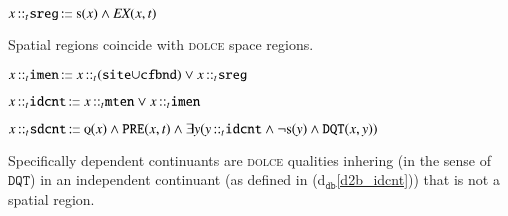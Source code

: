 \documentclass[ao]{iosart2x}
\newcommand{\dolceThrLabel}{\textrm{t$_\texttt{d}$}}
\newcommand{\dbDefLabel}{\textrm{d$_\texttt{db}$}}
\newcounter{cntdbdf}
\newcommand{\dbdf}[1]{\refstepcounter{cntdbdf}\begin{small}{\bf \dbDefLabel\thecntdbdf\label{#1}}\end{small}}
\newcommand{\refdolceth}[1]{({\dolceThrLabel}\ref{#1})}
\newcommand{\refdbdf}[1]{({\dbDefLabel}\ref{#1})}
\newcommand{\pr}[1]{\mathtt{#1}}
\newcommand{\prbfo}[1]{{\textit{{#1}}}}
\newcommand{\cn}[1]{\mathtt{#1}}
\newcommand\textequal{%
 \rule[.08ex]{5pt}{0.35pt}\llap{\rule[.78ex]{5pt}{0.35pt}}}
\newcommand{\sdef}{{\hspace{1.5pt}:\hspace{-2.5pt}\textequal\hspace{3pt}}}
\newcommand{\dolce}{{\textsc{dolce}}}
\newcommand{\bfo}{{\textsc{bfo}}}
\newcommand {\Mdcat} {\textsc{m}}
\newcommand {\Fdcat} {\textsc{f}}
\newcommand {\Qdcat} {\textsc{q}}
\newcommand {\Sdcat} {\textsc{s}}
\newcommand {\TPd} {\ensuremath{\pr{tP}}}
\newcommand {\Pd} {\ensuremath{\pr{P}}}
\newcommand {\PREd} {\ensuremath{\pr{PRE}}}
\newcommand {\DQTd} {\ensuremath{\pr{DQT}}}
\newcommand {\SDd} {\ensuremath{\pr{SD}}}
\newcommand {\Kd} {\ensuremath{\pr{K}}}
\newcommand {\SLCd} {\ensuremath{\pr{SLC}}}
\newcommand{\idcntbcat}{\cn{idcnt}}
\newcommand{\sdcntbcat}{\cn{sdcnt}}
\newcommand{\mtenbcat}{\cn{mten}}
\newcommand{\imenbcat}{\cn{imen}}
\newcommand{\sitebcat}{\cn{site}}
\newcommand{\cfbndbcat}{\cn{cfbnd}}
\newcommand{\sregbcat}{\cn{sreg}}
\newcommand{\rlzenbcat}{\cn{rlzen}}
\newcommand{\tregbcat}{\cn{treg}}
\newcommand{\qltbcat}{\cn{qlt}}
\newcommand{\bfoexist}{\prbfo{EX}}
\newcommand{\bfoiof}[1]{{\,::_{#1\:\!}}}
\begin{document}
%
%
%

\item[\dbdf{d2b_sreg}] $x \bfoiof{t} \sregbcat \sdef \Sdcat(x) \land \bfoexist(x,t)$

\vspace{1pt}
Spatial regions coincide with {\dolce} space regions.


\item[\dbdf{d2b_imen}] $x \bfoiof{t} \imenbcat \sdef x \bfoiof{t} (\sitebcat{\cup}\cfbndbcat) \lor x \bfoiof{t} \sregbcat$

\item[\dbdf{d2b_idcnt}] $x \bfoiof{t} \idcntbcat \sdef x \bfoiof{t} \mtenbcat \lor x \bfoiof{t} \imenbcat$

\item[\dbdf{d2b_sdcnt}] $x \bfoiof{t} \sdcntbcat \sdef \Qdcat(x) \land \PREd(x,t) \land \exists y(y \bfoiof{t} \idcntbcat \land \neg\Sdcat(y) \land \DQTd(x,y))$

\vspace{1pt}
Specifically dependent continuants are {\dolce} qualities inhering (in the sense of $\DQTd$) in an independent continuant (as defined in \refdbdf{d2b_idcnt}) that is not a spatial region.

%
%
%
%
\end{document}
